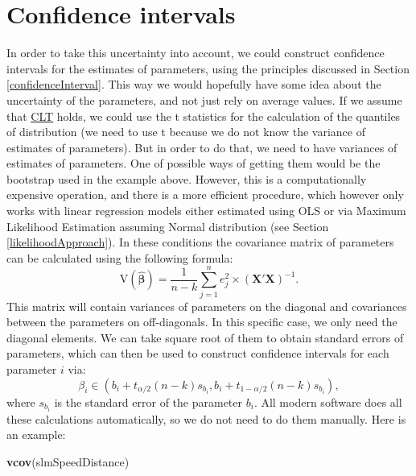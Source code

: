 \documentclass[
]{book}
\newenvironment{Shaded}{\begin{snugshade}}{\end{snugshade}}
\newcommand{\KeywordTok}[1]{\textcolor[rgb]{0.13,0.29,0.53}{\textbf{#1}}}
\newcommand{\NormalTok}[1]{#1}
\theoremstyle{definition}
\theoremstyle{definition}
\theoremstyle{definition}
\theoremstyle{definition}
\theoremstyle{remark}
\begin{document}
\hypertarget{confidence-intervals}{%
\section{Confidence intervals}\label{confidence-intervals}}

In order to take this uncertainty into account, we could construct confidence intervals for the estimates of parameters, using the principles discussed in Section \ref{confidenceInterval}. This way we would hopefully have some idea about the uncertainty of the parameters, and not just rely on average values. If we assume that \protect\hyperlink{CLT}{CLT} holds, we could use the t statistics for the calculation of the quantiles of distribution (we need to use t because we do not know the variance of estimates of parameters). But in order to do that, we need to have variances of estimates of parameters. One of possible ways of getting them would be the bootstrap used in the example above. However, this is a computationally expensive operation, and there is a more efficient procedure, which however only works with linear regression models either estimated using OLS or via Maximum Likelihood Estimation assuming Normal distribution (see Section \ref{likelihoodApproach}). In these conditions the covariance matrix of parameters can be calculated using the following formula:
\begin{equation}
    \mathrm{V}(\hat{\boldsymbol{\beta}}) = \frac{1}{n-k} \sum_{j=1}^n e_j^2 \times \left(\mathbf{X}' \mathbf{X}\right)^{-1}.
    \label{eq:MLRcovarianceMatrix}
\end{equation}
This matrix will contain variances of parameters on the diagonal and covariances between the parameters on off-diagonals. In this specific case, we only need the diagonal elements. We can take square root of them to obtain standard errors of parameters, which can then be used to construct confidence intervals for each parameter \(i\) via:
\begin{equation}
    \beta_i \in (b_i + t_{\alpha/2}(n-k) s_{b_i}, b_i + t_{1-\alpha/2}(n-k) s_{b_i}),
    \label{eq:MLRParameterInterval}
\end{equation}
where \(s_{b_i}\) is the standard error of the parameter \(b_i\). All modern software does all these calculations automatically, so we do not need to do them manually. Here is an example:

\begin{Shaded}
\begin{Highlighting}[]
\KeywordTok{vcov}\NormalTok{(slmSpeedDistance)}
\end{Highlighting}
\end{Shaded}
\end{document}
